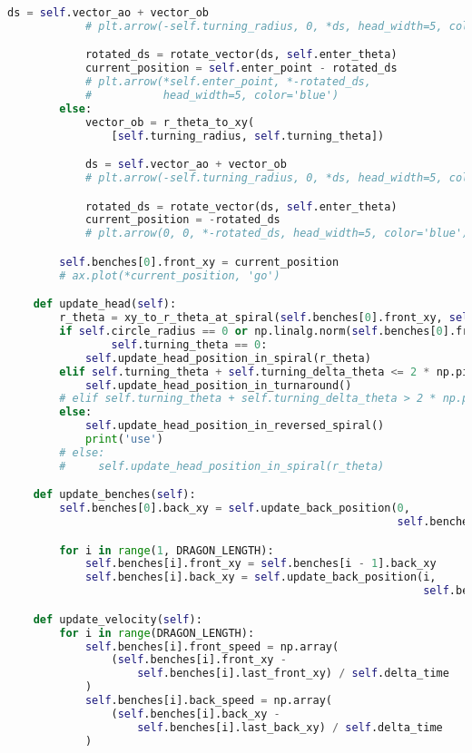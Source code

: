 \begin{lstlisting}[language=python]
            ds = self.vector_ao + vector_ob
            # plt.arrow(-self.turning_radius, 0, *ds, head_width=5, color='red')

            rotated_ds = rotate_vector(ds, self.enter_theta)
            current_position = self.enter_point - rotated_ds
            # plt.arrow(*self.enter_point, *-rotated_ds,
            #           head_width=5, color='blue')
        else:
            vector_ob = r_theta_to_xy(
                [self.turning_radius, self.turning_theta])

            ds = self.vector_ao + vector_ob
            # plt.arrow(-self.turning_radius, 0, *ds, head_width=5, color='red')

            rotated_ds = rotate_vector(ds, self.enter_theta)
            current_position = -rotated_ds
            # plt.arrow(0, 0, *-rotated_ds, head_width=5, color='blue')

        self.benches[0].front_xy = current_position
        # ax.plot(*current_position, 'go')

    def update_head(self):
        r_theta = xy_to_r_theta_at_spiral(self.benches[0].front_xy, self.b)
        if self.circle_radius == 0 or np.linalg.norm(self.benches[0].front_xy) > self.circle_radius and \
                self.turning_theta == 0:
            self.update_head_position_in_spiral(r_theta)
        elif self.turning_theta + self.turning_delta_theta <= 2 * np.pi:
            self.update_head_position_in_turnaround()
        # elif self.turning_theta + self.turning_delta_theta > 2 * np.pi:
        else:
            self.update_head_position_in_reversed_spiral()
            print('use')
        # else:
        #     self.update_head_position_in_spiral(r_theta)

    def update_benches(self):
        self.benches[0].back_xy = self.update_back_position(0,
                                                            self.benches[0].front_xy, DRAGON_HEAD_DISTANCE)

        for i in range(1, DRAGON_LENGTH):
            self.benches[i].front_xy = self.benches[i - 1].back_xy
            self.benches[i].back_xy = self.update_back_position(i,
                                                                self.benches[i].front_xy)

    def update_velocity(self):
        for i in range(DRAGON_LENGTH):
            self.benches[i].front_speed = np.array(
                (self.benches[i].front_xy -
                    self.benches[i].last_front_xy) / self.delta_time
            )
            self.benches[i].back_speed = np.array(
                (self.benches[i].back_xy -
                    self.benches[i].last_back_xy) / self.delta_time
            )


\end{lstlisting}
